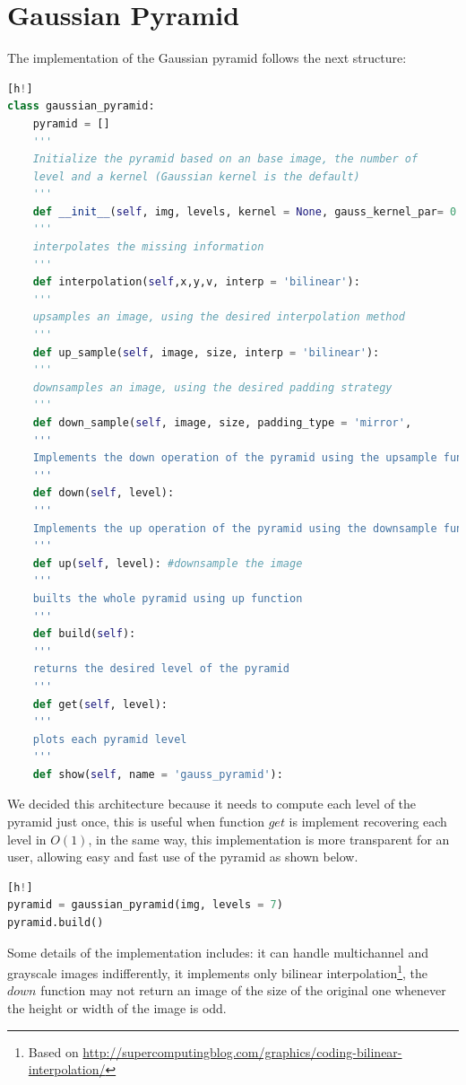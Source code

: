 \section{Gaussian Pyramid}

The implementation of the Gaussian pyramid follows the next structure:

\begin{lstlisting}[language=python][h!]
class gaussian_pyramid:
    pyramid = []
    '''
    Initialize the pyramid based on an base image, the number of 
    level and a kernel (Gaussian kernel is the default)
    '''
    def __init__(self, img, levels, kernel = None, gauss_kernel_par= 0.3):
    '''
    interpolates the missing information
    '''
    def interpolation(self,x,y,v, interp = 'bilinear'):
	'''
    upsamples an image, using the desired interpolation method
    '''
    def up_sample(self, image, size, interp = 'bilinear'):
    '''
    downsamples an image, using the desired padding strategy
    '''
    def down_sample(self, image, size, padding_type = 'mirror', 
	'''
    Implements the down operation of the pyramid using the upsample function
    '''
    def down(self, level):
	'''
    Implements the up operation of the pyramid using the downsample function
    '''
    def up(self, level): #downsample the image
    '''
    builts the whole pyramid using up function
    '''
    def build(self):
    '''
    returns the desired level of the pyramid
    '''
    def get(self, level):
    '''
    plots each pyramid level
    '''
    def show(self, name = 'gauss_pyramid'):
\end{lstlisting}

We decided this architecture because it needs to compute each level of the pyramid just once, this is useful when function $get$ is implement recovering each level in $O(1)$, in the same way, this implementation is more transparent for an user, allowing easy and fast use of the pyramid as shown below. 

\begin{lstlisting}[language=python][h!]
pyramid = gaussian_pyramid(img, levels = 7)
pyramid.build()
\end{lstlisting}

Some details of the implementation includes: it can handle multichannel and grayscale images indifferently, it implements only bilinear interpolation\footnote{Based on \url{http://supercomputingblog.com/graphics/coding-bilinear-interpolation/}}, the $down$ function may not return an image of the size of the original one whenever the height or width of the image is odd.

